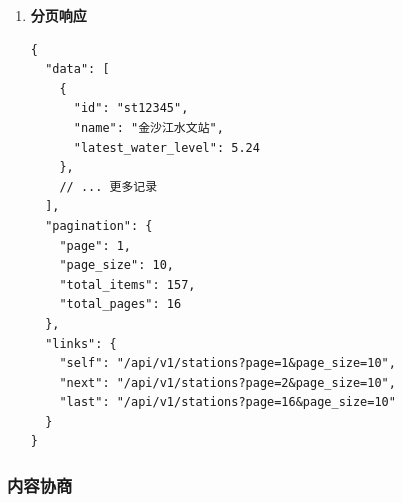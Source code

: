 \begin{enumerate}
\begin{lstlisting}
// 成功响应
{
  "data": {
    "id": "st12345",
    "name": "金沙江水文站",
    "location": {
      "longitude": 104.0668,
      "latitude": 30.5728
    },
    "latest_water_level": 5.24,
    "warning_level": 8.0
  },
  "links": {
    "self": "/api/v1/stations/st12345",
    "water_levels": "/api/v1/stations/st12345/water-levels",
    "related_reservoirs": "/api/v1/stations/st12345/related-reservoirs"
  }
}

// 错误响应
{
  "error": {
    "code": "INVALID_PARAMETER",
    "message": "查询参数无效",
    "details": "start_date必须是有效的ISO日期格式",
    "timestamp": "2023-06-15T08:30:45Z",
    "request_id": "req-123456"
  }
}
\end{lstlisting}
\item
  \textbf{分页响应}

\begin{lstlisting}
{
  "data": [
    {
      "id": "st12345",
      "name": "金沙江水文站",
      "latest_water_level": 5.24
    },
    // ... 更多记录
  ],
  "pagination": {
    "page": 1,
    "page_size": 10,
    "total_items": 157,
    "total_pages": 16
  },
  "links": {
    "self": "/api/v1/stations?page=1&page_size=10",
    "next": "/api/v1/stations?page=2&page_size=10",
    "last": "/api/v1/stations?page=16&page_size=10"
  }
}
\end{lstlisting}
\end{enumerate}

\subsubsection{内容协商}\label{ux5185ux5bb9ux534fux5546}

